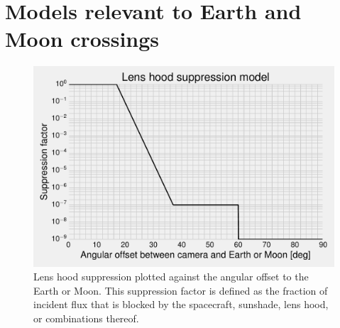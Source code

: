 \section{Models relevant to Earth and Moon crossings}
\label{sec:appendix}

\begin{figure}[!h] %
	\centering
	\includegraphics{figures/lens_hood_suppression.pdf}
	\caption{Lens hood suppression plotted against the angular offset to the Earth or Moon. This suppression factor is defined as the fraction of incident flux that is blocked by the spacecraft, sunshade, lens hood, or combinations thereof.}
	\label{fig:lens_hood_suppression}
\end{figure}
\newpage

